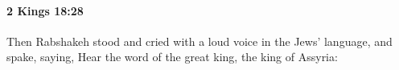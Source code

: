 
		\paragraph{2 Kings 18:28} %
			\label{2KINGS-18-28}

			Then Rabshakeh stood and cried with a loud voice in the Jews’ language, and spake, saying, Hear the word of the great king, the king of Assyria:


